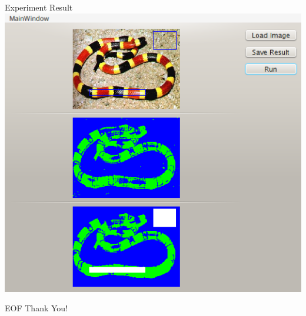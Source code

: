 \documentclass[14pt]{beamer}
\begin{document}
\begin{frame}{Experiment Result}
    \includegraphics[scale=0.45]{snake1.png}
\end{frame}

\begin{frame}{EOF}
    Thank You!
\end{frame}
\end{document}

